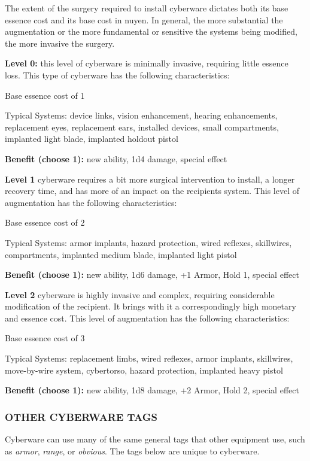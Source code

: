 \documentclass[oneside,10pt]{article}
\begin{document}
\begin{multicols}{2}
The extent of the surgery required to install cyberware dictates both its base essence cost and its base cost in nuyen. In
general, the more substantial the augmentation or the more
fundamental or sensitive the systems being modified, the
more invasive the surgery.

\textbf{Level 0:} this level of cyberware is minimally invasive, requiring little essence loss. This type of cyberware has the following characteristics:
\begin{adjustwidth*}{.5cm}{.5cm}

\tcirc{} Base essence cost of 1

\tcirc{} Typical Systems: device links, vision enhancement,
hearing enhancements, replacement eyes, replacement
ears, installed devices, small compartments, implanted
light blade, implanted holdout pistol

\tcirc{} \textbf{Benefit (choose 1):} new ability, 1d4 damage, special
effect
\end{adjustwidth*}
\textbf{Level 1} cyberware requires a bit more surgical intervention
to install, a longer recovery time, and has more of an impact
on the recipients system. This level of augmentation has the
following characteristics:
\begin{adjustwidth*}{.5cm}{.5cm}

\tcirc{} Base essence cost of 2

\tcirc{} Typical Systems: armor implants, hazard protection,
wired reflexes, skillwires, compartments, implanted
medium blade, implanted light pistol

\tcirc{} \textbf{Benefit (choose 1):} new ability, 1d6 damage, +1 Armor, Hold 1, special effect
\end{adjustwidth*}
\textbf{Level 2} cyberware is highly invasive and complex, requiring
considerable modification of the recipient. It brings with it a
correspondingly high monetary and essence cost. This level
of augmentation has the following characteristics:
\begin{adjustwidth*}{.5cm}{.5cm}

\tcirc{} Base essence cost of 3

\tcirc{} Typical Systems: replacement limbs, wired reflexes, armor implants, skillwires, move-by-wire system, cybertorso, hazard protection, implanted heavy pistol

\tcirc{} \textbf{Benefit (choose 1):} new ability, 1d8 damage, +2 Armor, Hold 2, special effect
\end{adjustwidth*}
\subsubsection{OTHER CYBERWARE TAGS}
Cyberware can use many of the same general tags that other
equipment use, such as \textit{armor}, \textit{range}, or \textit{obvious}. The tags
below are unique to cyberware.
\begin{adjustwidth*}{.5cm}{.5cm}


\end{adjustwidth*}
\end{multicols}
\end{document}
